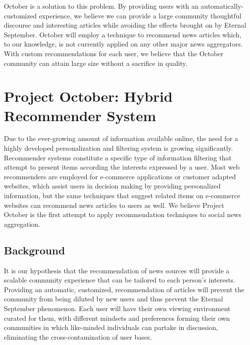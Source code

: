 \documentclass[11pt,letterpaper]{article}
\begin{document}
October is a solution to this problem.
By providing users with an automatically-customized experience, we believe we can provide a large community thoughtful discourse and interesting articles while avoiding the effects brought on by Eternal September.
October will employ a technique to recommend news articles which, to our knowledge, is not currently applied on any other major news aggregators.
With custom recommendations for each user, we believe that the October  community can attain large size without a sacrifice in quality.

\newpage


\section{Project October: Hybrid Recommender System}

Due to the ever-growing amount of information available online, the need for a highly developed personalization and filtering system is growing significantly.
Recommender systems constitute a specific type of information filtering that
attempt to present items according the interests expressed by a user.
Most web recommenders are employed for e-commerce applications or customer
adapted websites, which assist users in decision making by providing
personalized information, but the same techniques that
suggest related items on e-commerce websites can recommend news articles to users as well.
We believe Project October is the first attempt to apply recommendation techniques to social news aggregation.

\subsection{Background}
It is our hypothesis that the recommendation of news sources will provide a scalable community experience that can be tailored to each person's interests.
Providing an automatic, customized, recommendation of articles will prevent the community from being diluted by new users and thus prevent the Eternal September phenomenon.
Each user will have their own viewing environment curated for them, with different mindsets and preferences forming their own communities in which like-minded individuals can partake in discussion, eliminating the cross-contamination of user bases.

\end{document}
